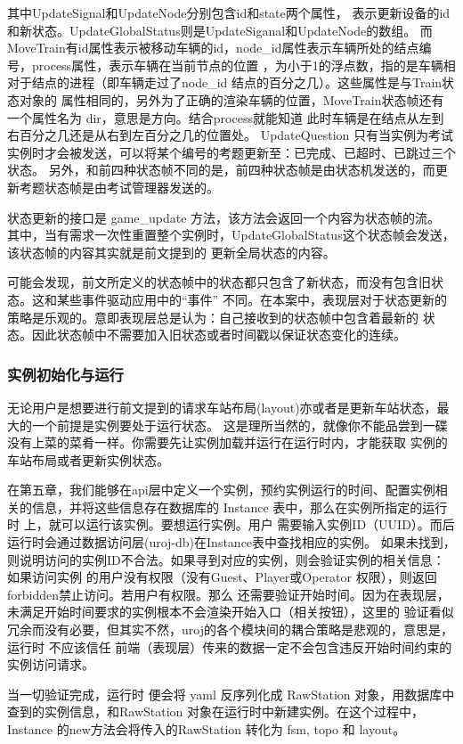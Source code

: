 其中UpdateSignal和UpdateNode分别包含id和state两个属性，
表示更新设备的id和新状态。UpdateGlobalStatus则是UpdateSiganal和UpdateNode的数组。
而MoveTrain有id属性表示被移动车辆的id，node\_id属性表示车辆所处的结点编号，process属性，表示车辆在当前节点的位置
，为小于1的浮点数，指的是车辆相对于结点的进程（即车辆走过了node\_id 结点的百分之几）。这些属性是与Train状态对象的
属性相同的，另外为了正确的渲染车辆的位置，MoveTrain状态帧还有一个属性名为 dir，意思是方向。结合process就能知道
此时车辆是在结点从左到右百分之几还是从右到左百分之几的位置处。
UpdateQuestion 只有当实例为考试实例时才会被发送，可以将某个编号的考题更新至：已完成、已超时、已跳过三个状态。
另外，和前四种状态帧不同的是，前四种状态帧是由状态机发送的，而更新考题状态帧是由考试管理器发送的。

状态更新的接口是 game\_update 方法，该方法会返回一个内容为状态帧的流。
其中，当有需求一次性重置整个实例时，UpdateGlobalStatus这个状态帧会发送，该状态帧的内容其实就是前文提到的
更新全局状态的内容。

可能会发现，前文所定义的状态帧中的状态都只包含了新状态，而没有包含旧状态。这和某些事件驱动应用中的“事件”
不同。在本案中，表现层对于状态更新的策略是乐观的。意即表现层总是认为：自己接收到的状态帧中包含着最新的
状态。因此状态帧中不需要加入旧状态或者时间戳以保证状态变化的连续。

\subsubsection{实例初始化与运行}
无论用户是想要进行前文提到的请求车站布局(layout)亦或者是更新车站状态，最大的一个前提是实例要处于运行状态。
这是理所当然的，就像你不能品尝到一碟没有上菜的菜肴一样。你需要先让实例加载并运行在运行时内，才能获取
实例的车站布局或者更新实例状态。

在第五章，我们能够在api层中定义一个实例，预约实例运行的时间、配置实例相关的信息，并将这些信息存在数据库的
Instance 表中，那么在实例所指定的运行时 上，就可以运行该实例。要想运行实例。用户
需要输入实例ID（UUID）。而后运行时会通过数据访问层(uroj-db)在Instance表中查找相应的实例。
如果未找到，则说明访问的实例ID不合法。如果寻到对应的实例，则会验证实例的相关信息：如果访问实例
的用户没有权限（没有Guest、Player或Operator 权限），则返回forbidden禁止访问。若用户有权限。那么
还需要验证开始时间。因为在表现层，未满足开始时间要求的实例根本不会渲染开始入口（相关按钮），这里的
验证看似冗余而没有必要，但其实不然，uroj的各个模块间的耦合策略是悲观的，意思是，运行时 不应该信任
前端（表现层）传来的数据一定不会包含违反开始时间约束的实例访问请求。

当一切验证完成，运行时 便会将 yaml 反序列化成 RawStation 对象，用数据库中查到的实例信息，和RawStation
对象在运行时中新建实例。在这个过程中，Instance 的new方法会将传入的RawStation 转化为 fsm, topo 和 layout。

